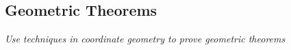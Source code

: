 \subsection{Geometric Theorems}

\textit{Use techniques in coordinate geometry to prove geometric theorems}

